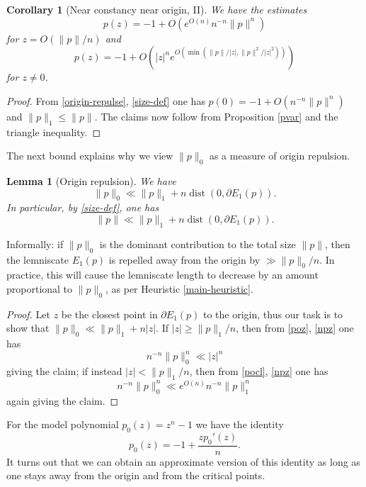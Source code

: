 \documentclass[12pt]{amsart}
\newtheorem{lemma}{Lemma}[section]
\newtheorem{corollary}{Corollary}[section]
\begin{document}
\begin{corollary}[Near constancy near origin, II]\label{pvar-cor} We have the estimates
    \begin{equation}\label{pin}
 p(z) = -1 + O(e^{O(n)} n^{-n} \|p\|^n)
\end{equation}
for $z = O(\|p\|/n)$ and
\begin{equation}\label{pin-2}
    p(z) = -1 + O(|z|^n e^{O(\min(\|p\|/|z|,\|p\|^2/|z|^2))})
\end{equation}
for $z \neq 0$.
\end{corollary}

\begin{proof}  From \eqref{origin-repulse}, \eqref{size-def} one has $p(0) = -1 + O(n^{-n} \|p\|^n)$ and $\|p\|_1 \leq \|p\|$.  The claims now follow from Proposition \ref{pvar} and the triangle inequality.
\end{proof}

The next bound explains why we view $\|p\|_0$ as a measure of origin repulsion.

\begin{lemma}[Origin repulsion]\label{origin-repulsion}  We have
$$ \|p\|_0 \ll \| p \|_1 + n \operatorname{dist}(0, \partial E_1(p)).$$
In particular, by \eqref{size-def}, one has
$$ \|p\| \ll \| p \|_1 + n \operatorname{dist}(0, \partial E_1(p)).$$
\end{lemma}

Informally: if $\|p\|_0$ is the dominant contribution to the total size $\|p\|$, then the lemniscate $E_1(p)$ is repelled away from the origin by $\gg \|p\|_0/n$.  In practice, this will cause the lemniscate length to decrease by an amount proportional to $\|p\|_0$, as per Heuristic \ref{main-heuristic}.

\begin{proof}  Let $z$ be the closest point in $\partial E_1(p)$ to the origin, thus our task is to show that $\|p\|_0 \ll \| p \|_1 + n |z|$.  If $|z| \geq \|p\|_1/n$, then from \eqref{poz}, \eqref{npz} one has
$$ n^{-n} \|p\|_0^n \ll |z|^n$$
giving the claim; if instead $|z| < \|p\|_1/n$, then from \eqref{pocl}, \eqref{npz} one has
$$ n^{-n} \|p\|_0^n \ll e^{O(n)} n^{-n} \|p\|_1^n$$
again giving the claim.
\end{proof}


For the model polynomial $p_0(z) = z^n - 1$ we have the identity
$$ p_0(z) = -1 + \frac{z p_0'(z)}{n}.$$
It turns out that we can obtain an approximate version of this identity as long as one stays away from the origin and from the critical points.
\end{document}

